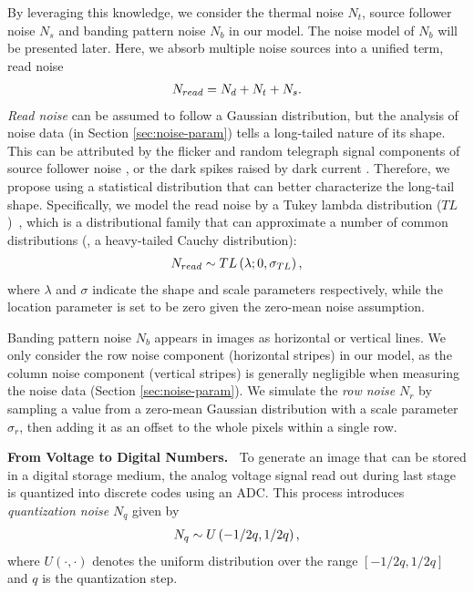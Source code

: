 \documentclass[10pt,twocolumn,letterpaper]{article}
\begin{document}
By leveraging this knowledge,  we consider the thermal noise $N_{t}$, source follower noise $N_s$ and banding
pattern noise $N_{b}$ in our model.  The noise model of $N_{b}$ will be presented later. Here, 
we absorb multiple noise sources
into a
unified term, \ie read noise
\vspace{-1mm}
\begin{align}
N_{read} = N_d  + N_t +  N_s.
\vspace{-1mm}
\end{align}
\textit{Read noise} can be assumed to follow a Gaussian distribution, but the analysis of
noise data (in Section \ref{sec:noise-param}) tells a long-tailed nature of its
shape. This can be attributed by the flicker and random telegraph signal components of source
follower noise \cite{Gow2007A}, or the dark spikes raised by dark current
\cite{Mikhail2014Highlevel}. 
Therefore, we propose using a statistical distribution that can better characterize the long-tail shape.
Specifically, we model the read
noise by a Tukey lambda distribution ($TL$)~\cite{Joiner1971Some}, which is a
distributional family that can approximate a number of common distributions (\eg,
a heavy-tailed Cauchy distribution):
\vspace{-1mm}
\begin{align}
N_{read} \sim \mathop{TL} \left( \lambda; 0, \sigma_{TL} \right),
\label{eq: noise-tl}
\vspace{-1mm}
\end{align}
where $\lambda$ and $\sigma$ indicate the shape and scale parameters
respectively, while the location parameter is set to be zero given the
zero-mean noise assumption.

Banding pattern noise $N_b$ appears in images as horizontal or vertical lines. We only consider the row noise component (horizontal stripes) in our model, as the column noise component (vertical stripes) is generally negligible
when measuring the noise data (Section \ref{sec:noise-param}). We simulate the
\textit{row noise} $N_r$ by sampling a value from a zero-mean Gaussian distribution with a scale parameter $\sigma_r$, then adding it as an offset to the whole pixels within a single row. 

\vspace{3pt}
\noindent\textbf{From Voltage to Digital Numbers.~}
To generate an image that can be stored in a digital storage medium, the
analog voltage signal read out during last stage is quantized into discrete
codes using an ADC. This process introduces \textit{quantization noise} $N_q$ given by
\vspace{-1mm}
\begin{align}
N_q \sim U \left( -1/2 q , 1/2 q \right),
\vspace{-1mm}
\end{align}
where $U (\cdot, \cdot)$ denotes the uniform distribution over the range
$[-1/2 q , 1/2 q]$ and $q$ is the quantization step.
\end{document}
